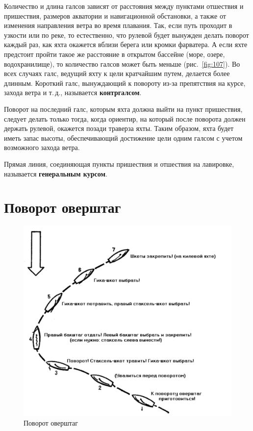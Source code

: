 \documentclass[a4paper, 12pt, twoside, final]{scrbook}
\begin{document}
Количество и длина галсов зависят от расстояния между пунктами отшествия и пришествия, размеров акватории и навигационной обстановки, а также от изменения направления ветра во время плавания. Так, если путь проходит в узкости или по реке, то естественно, что рулевой будет вынужден делать поворот каждый раз, как яхта окажется вблизи берега или кромки фарватера. А если яхте предстоит пройти такое же расстояние в открытом бассейне (море, озере, водохранилище), то количество галсов может быть меньше (рис.~\ref{fig:107}). Во всех случаях галс, ведущий яхту к цели кратчайшим путем, делается более длинным. Короткий галс, вынуждающий к повороту из-за препятствия на курсе, захода ветра и т.\,д., называется \textbf{контргалсом}.

Поворот на последний галс, которым яхта должна выйти на пункт пришествия, следует делать только тогда, когда ориентир, на который после поворота должен держать рулевой, окажется позади траверза яхты. Таким образом, яхта будет иметь запас высоты, обеспечивающий достижение цели одним галсом с учетом возможного захода ветра.

Прямая линия, соединяющая пункты пришествия и отшествия на лавировке, называется \textbf{генеральным курсом}.

\section{Поворот оверштаг}

\begin{figure}[htbp]
   \centering
   \includegraphics{pics/108_Povorot_overshtag} %
   \caption{Поворот оверштаг}
   \label{fig:108}
\end{figure}
\end{document}
